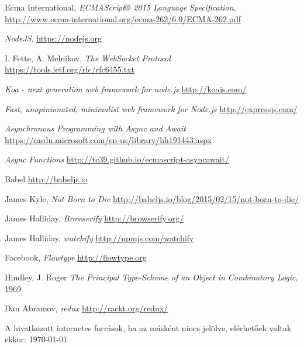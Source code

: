 \documentclass[12pt]{article}
\begin{document}
\begin{thebibliography}{9}
  Ecma International, \emph{ECMAScript® 2015 Language Specification},
  \url{http://www.ecma-international.org/ecma-262/6.0/ECMA-262.pdf}

  \emph{NodeJS}, \url{https://nodejs.org}

  I. Fette, A. Melnikov,
  \emph{The WebSocket Protocol}
  \url{https://tools.ietf.org/rfc/rfc6455.txt}

  \emph{Koa - next generation web framework for node.js}
  \url{http://koajs.com/}

  \emph{Fast, unopinionated, minimalist web framework for Node.js}
  \url{http://expressjs.com/}

  \emph{Asynchronous Programming with Async and Await}
  \url{https://msdn.microsoft.com/en-us/library/hh191443.aspx}

  \emph{Async Functions}
  \url{http://tc39.github.io/ecmascript-asyncawait/}

  Babel
  \url{http://babeljs.io}

  James Kyle, \emph{Not Born to Die}
  \url{http://babeljs.io/blog/2015/02/15/not-born-to-die/}

  James Halliday, \emph{Browserify} \url{http://browserify.org/}

  James Halliday, \emph{watchify} \url{http://npmjs.com/watchify}

  Facebook, \emph{Flowtype} \url{http://flowtype.org}

  Hindley, J. Roger \emph{The Principal Type-Scheme of an Object in Combinatory Logic}, 1969

  Dan Abramov, \emph{redux} \url{http://rackt.org/redux/}

\end{thebibliography}

A hivatkozott internetes források, ha az másként nincs jelölve, elérhetőek voltak ekkor: \today
\end{document}
